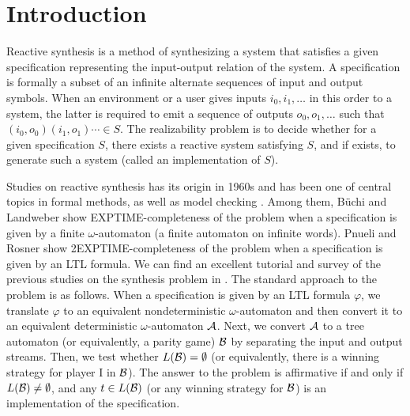 \section{Introduction}
\noindent
Reactive synthesis is a method of synthesizing a system that satisfies a given specification
representing the input-output relation of the system.
A specification is formally a subset of an infinite alternate sequences of input and output symbols.
When an environment or a user gives inputs $i_0, i_1, \ldots$ in this order
to a system, the latter is required to emit a sequence
of outputs $o_0, o_1, \ldots$ such that $(i_0, o_0)(i_1, o_1)\cdots \in S$.
The realizability problem is to decide whether for a given specification $S$,
there exists a reactive system satisfying $S$, and if exists, to generate such a system
(called an implementation of $S$).

Studies on reactive synthesis has its origin in 1960s and has been one of central topics
in formal methods, as well as model checking \cite{CGP01}.
Among them, B\"{u}chi and Landweber \cite{BL69} show EXPTIME-completeness of the problem
when a specification is given by a finite $\omega$-automaton (a finite automaton on infinite words).
Pnueli and Rosner \cite{PR89} show 2EXPTIME-completeness of the problem
when a specification is given by an LTL formula.
We can find an excellent tutorial and survey of the previous studies
on the synthesis problem in \cite{BCJ18}.
The standard approach to the problem is as follows.
When a specification is given by an LTL formula $\varphi$, we translate $\varphi$ to
an equivalent nondeterministic $\omega$-automaton and then convert it to
an equivalent deterministic $\omega$-automaton ${\cal A}$.
Next, we convert ${\cal A}$ to a tree automaton (or equivalently, a parity game) ${\cal B}$
by separating the input and output streams.
Then, we test whether $L({\cal B})=\emptyset$ (or equivalently, there is a winning strategy
for player I in ${\cal B}$).
The answer to the problem is affirmative if and only if $L({\cal B})\not=\emptyset$,
and any $t\in L({\cal B})$ (or any winning strategy for ${\cal B}$)
is an implementation of the specification.

